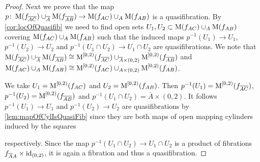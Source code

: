 \begin{prop}
\begin{proof}
        Next we prove that the map $p\colon\operatorname{M}(f_{\overline{A}\overline{C}})\cup_{\overline{A}}\operatorname{M}(f_{\overline{A}\overline{B}})\to\operatorname{M}(f_{AC})\cup_A\operatorname{M}(f_{AB})$ is a quasifibration.
        By \cref{cor:locOfQuasifib} we need to find open sets $U_1,U_2\subset\operatorname{M}(f_{AC})\cup_A\operatorname{M}(f_{AB})$ covering $\operatorname{M}(f_{AC})\cup_A\operatorname{M}(f_{AB})$ such that the induced maps $p^{-1}(U_1)\to U_1$, $p^{-1}(U_2)\to U_2$ and $p^{-1}(U_1\cap U_2)\to U_1\cap U_2$ are quasifibrations.
        We note that $\operatorname{M}(f_{\overline{A}\overline{C}})\cup_{\overline{A}}\operatorname{M}(f_{\overline{A}\overline{B}})\cong\operatorname{M}^{[0,2)}(f_{\overline{A}\overline{C}})\cup_{\overline{A}\times(0,2)}\operatorname{M}^{[0,2)}(f_{\overline{A}\overline{B}})$ and $\operatorname{M}(f_{AC})\cup_A\operatorname{M}(f_{AB})\cong\operatorname{M}^{[0,2)}(f_{AC})\cup_{A\times (0,2)}\operatorname{M}^{[0,2)}(f_{AB})$.

        We take $U_1=\operatorname{M}^{[0,2)}(f_{AC})$ and $U_2=\operatorname{M}^{[0,2)}(f_{AB})$. 
        Then $p^{-1}(U_1)=\operatorname{M}^{[0,2)}(f_{\overline{A}\overline{C}})$, $p^{-1}(U_2)=\operatorname{M}^{[0,2)}(f_{\overline{A}\overline{B}})$ and $p^{-1}(U_1\cap U_2)=\overline{A}\times (0,2)$.
        It follows $p^{-1}(U_1)\to U_1$ and $p^{-1}(U_2)\to U_2$ are quasifibrations by \cref{lem:mapOfCylIsQuasiFib} since they are both maps of open mapping cylinders induced by the squares 
        \begin{center}
        \end{center}
        respectively.
        Since the map $p^{-1}(U_1\cap U_2)\to U_1\cap U_2$ is a product of fibrations $f_{\overline{A}A}\times\text{id}_{(0,2)}$, it is again a fibration and thus a quasifibration.


\end{proof}
\end{prop}
